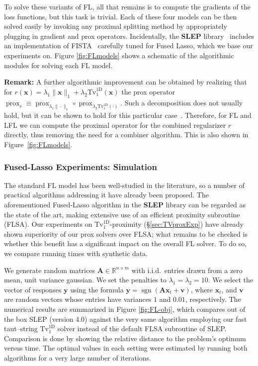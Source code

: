 \documentclass[twoside,11pt]{article}
\newcommand{\vv}{\bm{v}}       \newcommand{\vvh}{\hat{\bm{v}}}        \newcommand{\vh}{\hat{v}}    \newcommand{\vvt}{\tilde{\bm{v}}}       \newcommand{\vtild}{\tilde{v}}
\newcommand{\vx}{\bm{x}}       \newcommand{\vxh}{\hat{\bm{x}}}        \newcommand{\xh}{\hat{x}}    \newcommand{\vxt}{\tilde{\bm{x}}}       \newcommand{\xt}{\tilde{x}}
\newcommand{\vy}{\bm{y}}       \newcommand{\vyh}{\hat{\bm{y}}}        \newcommand{\yh}{\hat{y}}    \newcommand{\vyt}{\tilde{\bm{y}}}       \newcommand{\yt}{\tilde{y}}
\newcommand{\ma}{\bm{A}}
\newcommand{\mynorm}[2]{\| {#1} \|_{#2}}
\newcommand{\norm}[2]{\mynorm{#1}{#2}}
\DeclareMathOperator{\sgn}{sgn}
\DeclareMathOperator{\prox}{prox}
\newcommand{\reals}{\mathbb{R}}
\newcommand{\tvell}{\text{Tv}}
\newcommand{\oned}{\text{1D}}
\numberwithin{equation}{section}
\numberwithin{theorem}{section}
\begin{document}
To solve these variants of FL, all that remains is to compute the gradients of the loss functions, but this task is trivial.
Each of these four models can be then solved easily by invoking any proximal splitting method by appropriately plugging in gradient and prox operators. Incidentally, the {\bf SLEP} library~\citep{liuYe10} includes an implementation of FISTA~\citep{fista} carefully tuned for Fused Lasso, which we base our experiments on. Figure \ref{fig:FLmodels} shows a schematic of the algorithmic modules for solving each FL model.

\textbf{Remark:} A further algorithmic improvement can be obtained by realizing that for $r(\vx) = \lambda_1 \norm{\vx}{1} + \lambda_2 \tvell_1^{\oned}(\vx)$ the prox operator $\prox_{r} \equiv \prox_{\lambda_1 \norm{\cdot}{1}} \circ \prox_{\lambda_2 \tvell_1^{\oned}(\cdot)}$. Such a decomposition does not usually hold, but it can be shown to hold for this particular case~\citep{yaoLiang,rinaldo,fl}. Therefore, for FL and LFL we can compute the proximal operator for the combined regularizer $r$ directly, thus removing the need for a combiner algorithm. This is also shown in Figure~\ref{fig:FLmodels}.

\subsubsection{Fused-Lasso Experiments: Simulation}

The standard FL model has been well-studied in the literature, so a number of practical algorithms addressing it have already been proposed. The aforementioned Fused-Lasso algorithm in the {\bf SLEP} library can be regarded as the state of the art, making extensive use of an efficient proximity subroutine (FLSA). Our experiments on $\tvell_1^{\oned}$-proximity (\S\ref{sec:TVproxExp}) have already shown superiority of our prox solvers over FLSA; what remains to be checked is whether this benefit has a significant impact on the overall FL solver. To do so, we compare running times with synthetic data.

We generate random matrices $\ma \in \reals^{n \times m}$ with i.i.d.\ entries drawn from a zero mean, unit variance gaussian. We set the penalties to $\lambda_1 = \lambda_2 = 10$. We select the vector of responses $\vy$ using the formula $\vy=\sgn(\ma \vx_t + \vv)$, where $\vx_t$, and $\vv$ are random vectors whose entries have variances $1$ and $0.01$, respectively. The numerical results are summarized in Figure \ref{fig:FL-obj}, which compares out of the box SLEP (version 4.0) \citep{slep} against the very same algorithm employing our fast taut--string $\tvell_1^{\oned}$ solver instead of the default FLSA subroutine of SLEP. Comparison is done by showing the relative distance to the problem's optimum versus time. The optimal values in each setting were estimated by running both algorithms for a very large number of iterations.
\end{document}
